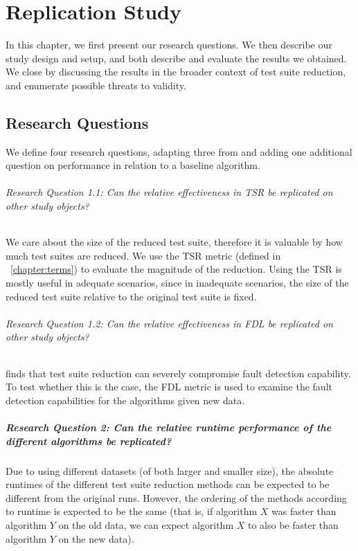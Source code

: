 
\chapter{Replication Study}\label{chapter:replication_study}

In this chapter, we first present our research questions. We then describe
our study design and setup, and both describe and evaluate the results
we obtained. We close by discussing the results in the broader context
of test suite reduction, and enumerate possible threats to validity.

\section{Research Questions}

We define four research questions, adapting three from
\cite{cruciani2019scalable} and adding one additional question on
performance in relation to a baseline algorithm.

\subparagraph{Research Question 1.1: Can the relative effectiveness in TSR be replicated on other study objects?}

We care about the size of the reduced test suite, therefore it is valuable
by how much test suites are reduced. We use the TSR metric (defined
in ~\ref{chapter:terms}) to evaluate the magnitude of the reduction.
Using the TSR is mostly useful in adequate scenarios, since in inadequate
scenarios, the size of the reduced test suite relative to the original
test suite is fixed.

\subparagraph{Research Question 1.2: Can the relative effectiveness in FDL be replicated on other study objects?}

\cite{rothermel2002empirical} finds that test suite reduction can severely
compromise fault detection capability. To test whether this is the case,
the FDL metric is used to examine the fault detection capabilities
for the algorithms given new data.

\paragraph{Research Question 2: Can the relative runtime performance of the different algorithms be replicated?}

Due to using different datasets (of both larger and smaller size), the
absolute runtimes of the different test suite reduction methods can be
expected to be different from the original runs. However, the ordering of
the methods according to runtime is expected to be the same (that is, if
algorithm $X$ was faster than algorithm $Y$ on the old data, we can expect
algorithm $X$ to also be faster than algorithm $Y$ on the new data).

